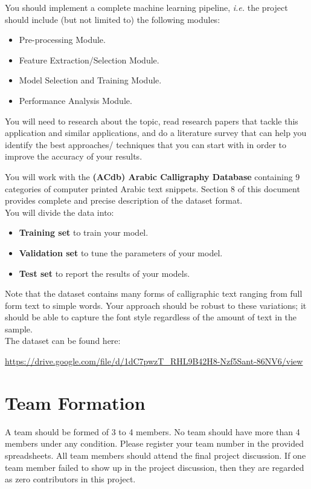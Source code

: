 \documentclass[12pt]{article}
\begin{document}
You should implement a complete machine learning pipeline, \textit{i.e.} the project should include (but not limited to) the following modules: 
\begin{itemize}
    \item Pre-processing Module.
    \item Feature Extraction/Selection Module. 
    \item Model Selection and Training Module.
    \item Performance Analysis Module.
\end{itemize}

You will need to research about the topic, read research papers that tackle this application and similar applications, and do a literature survey that can help you identify the best approaches/ techniques that you can start with in order to improve the accuracy of your results. 

\newpage
You will work with the \textbf{(ACdb) Arabic Calligraphy Database } containing 9 categories of computer printed Arabic text snippets. Section 8 of this document provides complete and precise description of the dataset format.\\
You will divide the data into: 
\begin{itemize}
    \item \textbf{Training set} to train your model. 
    \item \textbf{Validation set} to tune the parameters of your model. 
    \item \textbf{Test set} to report the results of your models. 
\end{itemize}
 
Note that the dataset contains many forms of calligraphic text ranging from full form text to simple words. Your approach should be robust to these variations; it should be able to capture the font style regardless of the amount of text in the sample.\\
The dataset can be found here:\\
\begin{center}
\url{https://drive.google.com/file/d/1dC7pwzT_RHL9B42H8-Nzf5Sant-86NV6/view}
\end{center}

\section{Team Formation}
A team should be formed of 3 to 4 members. No team should have more than 4 members under any condition. Please register your team number in the provided spreadsheets.
All team members should attend the final project discussion. If one team member failed to show up in the project discussion, then they are regarded as zero contributors in this project.
\end{document}
